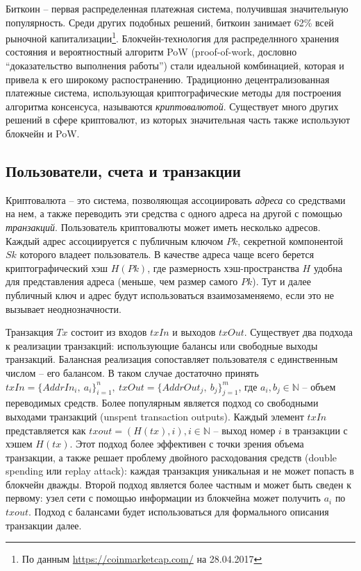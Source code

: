\documentclass[specification,annotation]{itmo-student-thesis}
\begin{document}
Биткоин -- первая распределенная платежная система, получившая
значительную популярность. Среди других подобных решений, биткоин
занимает 62\% всей рыночной капитализации\footnote{По данным
  \url{https://coinmarketcap.com/} на 28.04.2017}. Блокчейн-технология
для распределнного хранения состояния и вероятностный алгоритм PoW
(proof-of-work, дословно ``доказательство выполнения работы'') стали
идеальной комбинацией, которая и привела к его широкому
распостранению. Традиционно децентрализованная платежные система,
использующая криптографические методы для построения алгоритма
консенсуса, называются {\it криптовалютой}. Существует много других
решений в сфере криптовалют, из которых значительная часть также
используют блокчейн и PoW.

\subsection{Пользователи, счета и транзакции}

Криптовалюта -- это система, позволяющая ассоциировать {\it адреса} со
средствами на нем, а также переводить эти средства с одного адреса на
другой с помощью {\it транзакций}. Пользователь криптовалюты может
иметь несколько адресов. Каждый адрес ассоциируется с публичным ключом
$Pk$, секретной компонентой $Sk$ которого владеет пользователь. В
качестве адреса чаще всего берется криптографический хэш $H(Pk)$, где
размерность хэш-пространства $H$ удобна для представления адреса
(меньше, чем размер самого $Pk$). Тут и далее публичный ключ и адрес
будут использоваться взаимозаменяемо, если это не вызывает
неоднозначности.

Транзакция $Tx$ состоит из входов $txIn$ и выходов $txOut$. Существует
два подхода к реализации транзакций: использующие балансы или
свободные выходы транзакций. Балансная реализация сопоставляет
пользователя с единственным числом -- его балансом. В таком случае
достаточно принять $txIn = \{AddrIn_i,\ a_i\}_{i=1}^n, \ txOut =
\{AddrOut_j,\ b_j\}_{j=1}^m$, где $a_i, b_j \in \mathbb{N}$ -- объем
переводимых средств. Более популярным является подход со свободными
выходами транзакций (unspent transaction outputs). Каждый элемент
$txIn$ представляется как $txout = (H(tx), i), i \in \mathbb{N}$ --
выход номер $i$ в транзакции с хэшем $H(tx)$. Этот подход более
эффективен с точки зрения объема транзакции, а также решает проблему
двойного расходования средств (double spending или replay attack):
каждая транзакция уникальная и не может попасть в блокчейн
дважды. Второй подход является более частным и может быть сведен к
первому: узел сети с помощью информации из блокчейна может получить
$a_i$ по $txout$. Подход с балансами будет использоваться для
формального описания транзакции далее.
\end{document}
